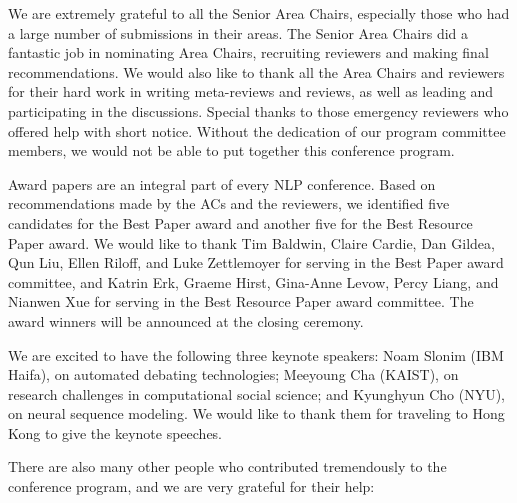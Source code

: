 We are extremely grateful to all the Senior Area Chairs, especially those who had a large number of submissions in their areas. The Senior Area Chairs did a fantastic job in nominating Area Chairs, recruiting reviewers and making final recommendations. We would also like to thank all the Area Chairs and reviewers for their hard work in writing meta-reviews and reviews, as well as leading and participating in the discussions. Special thanks to those emergency reviewers who offered help with short notice. Without the dedication of our program committee members, we would not be able to put together this conference program.

Award papers are an integral part of every NLP conference. Based on recommendations made by the ACs and the reviewers, we identified five candidates for the Best Paper award and another five for the Best Resource Paper award. We would like to thank Tim Baldwin, Claire Cardie, Dan Gildea, Qun Liu, Ellen Riloff, and Luke Zettlemoyer for serving in the Best Paper award committee, and Katrin Erk, Graeme Hirst, Gina-Anne Levow, Percy Liang, and Nianwen Xue for serving in the Best Resource Paper award committee. The award winners will be announced at the closing ceremony.


We are excited to have the following three keynote speakers: Noam Slonim (IBM Haifa), on automated debating technologies; Meeyoung Cha (KAIST), on research challenges in computational social science; and Kyunghyun Cho (NYU), on neural sequence modeling. We would like to thank them for traveling to Hong Kong to give the keynote speeches.

There are also many other people who contributed tremendously to the conference program, and we are very grateful for their help:


